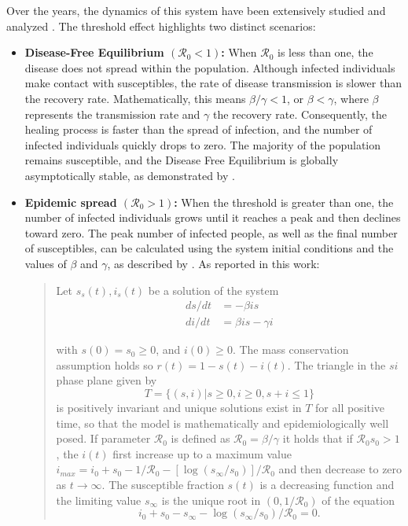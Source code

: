Over the years, the dynamics of this system have been extensively studied and analyzed \cite{Breda_2012, akinboro2014numerical, Jard_n_Kojakhmetov_2021, Ledder_2023, Okabe_2020, Prodanov_2022, Xu_2014, Turkyilmazoglu_2021}. The threshold effect highlights two distinct scenarios:
\begin{itemize}
	\item \textbf{Disease-Free Equilibrium $(\mathcal{R}_0 < 1)$:} When $\mathcal{R}_0$ is less than one, the disease does not spread within the population. Although infected individuals make contact with susceptibles, the rate of disease transmission is slower than the recovery rate. Mathematically, this means $\beta / \gamma < 1$, or $\beta < \gamma$, where $\beta$ represents the transmission rate and $\gamma$ the recovery rate. Consequently, the healing process is faster than the spread of infection, and the number of infected individuals quickly drops to zero. The majority of the population remains susceptible, and the Disease Free Equilibrium is globally asymptotically stable, as demonstrated by \cite{Hernandez_Vargas_2022}.
	\item \textbf{Epidemic spread $(\mathcal{R}_0 > 1)$:}     When the threshold is greater than one, the number of infected individuals grows until it reaches a peak and then declines toward zero. The peak number of infected people, as well as the final number of susceptibles, can be calculated using the system initial conditions and the values of $\beta$ and $\gamma$, as described by \cite{Hethcote_2000}. 
	As reported in this work:
	\begin{quotation}\small
	Let $s_s(t),i_s(t)$ be a solution of the system 
	\begin{equation}
		\begin{split} 
			ds/dt &= -\beta i s\\
			di/dt &= \beta i s - \gamma i	
		\end{split}
	\end{equation}

	with $s(0) = s_0 \ge 0$, and $i(0) \ge 0$. The mass conservation assumption holds so $r(t) = 1-s(t)-i(t)$. The triangle in the $si$ phase plane given by 
	\[T = \{(s,i)|s \ge 0, i\ge 0, s+i \le 1 \}\]
	is positively invariant and unique solutions exist in $T$ for all positive time, so that the
	model is mathematically and epidemiologically well posed.
	If parameter $\mathcal{R}_0$ is defined as $\mathcal{R}_0=\beta/\gamma$ it holds that if $\mathcal{R}_0 s_0 >1$, the $i(t)$ first increase up to a maximum value $i_{max} = i_0 + s_0 - 1/\mathcal{R}_0 - [\log(s_\infty/s_0)]/\mathcal{R}_0 $ and then decrease to zero as $t \rightarrow \infty$. The susceptible fraction $s(t)$ is a decreasing function and the limiting value $s_\infty$ is the
	unique root in $(0, 1/\mathcal{R}_0)$ of the equation
	\[
	i_0 + s_0 -s_\infty - \log(s_\infty/s_0)/\mathcal{R}_0 = 0. 
	\]		
	\end{quotation}
	

\end{itemize}
